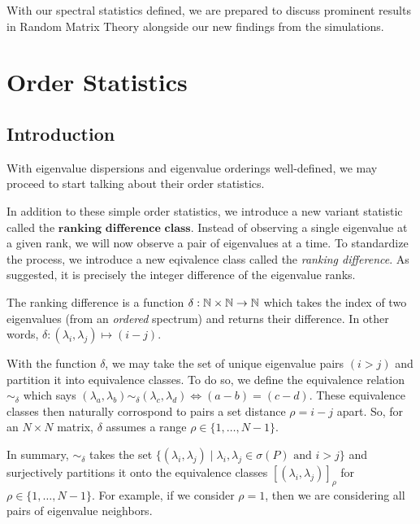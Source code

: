 With our spectral statistics defined, we are prepared to discuss prominent results in Random Matrix Theory alongside our new findings from the simulations. 


\section{Order Statistics}
\subsection{Introduction}
With eigenvalue dispersions and eigenvalue orderings well-defined, we may proceed to start talking about their order statistics. 

In addition to these simple order statistics, we introduce a new variant statistic called the $\textbf{ranking difference class}$. Instead of observing a single eigenvalue at a given rank, we will now observe a pair of eigenvalues at a time. To standardize the process, we introduce a new eqivalence class called the \textit{ranking difference}. As suggested, it is precisely the integer difference of the eigenvalue ranks.

\begin{definition}
The ranking difference is a function $\delta: \mathbb{N} \times \mathbb{N} \to \mathbb{N}$ which takes the index of two eigenvalues (from an \textit{ordered} spectrum) and returns their difference. In other words, $\delta : (\lambda_i,\lambda_j) \mapsto (i - j)$.
\end{definition}

With the function $\delta$, we may take the set of unique eigenvalue pairs $(i > j)$ and partition it into equivalence classes. To do so, we define the equivalence relation $\sim_\delta$ which says $(\lambda_a,\lambda_b) \sim_\delta (\lambda_c,\lambda_d) \iff (a -b) = (c-d)$. These equivalence classes then naturally corrospond to pairs a set distance $\rho = i - j$ apart. So, for an $N \times N$ matrix, $\delta$ assumes a range $\rho \in \{ 1,\dots,N-1\}$.

In summary, $\sim_\delta$ takes the set $\{(\lambda_i, \lambda_j) \mid \lambda_i, \lambda_j \in \sigma(P) \text{ and } i > j \}$ and surjectively partitions it onto the equivalence classes $[(\lambda_i, \lambda_j)]_\rho$ for $\rho \in \{ 1,\dots,N-1\}$. For example, if we consider $\rho = 1$, then we are considering all pairs of eigenvalue neighbors.

